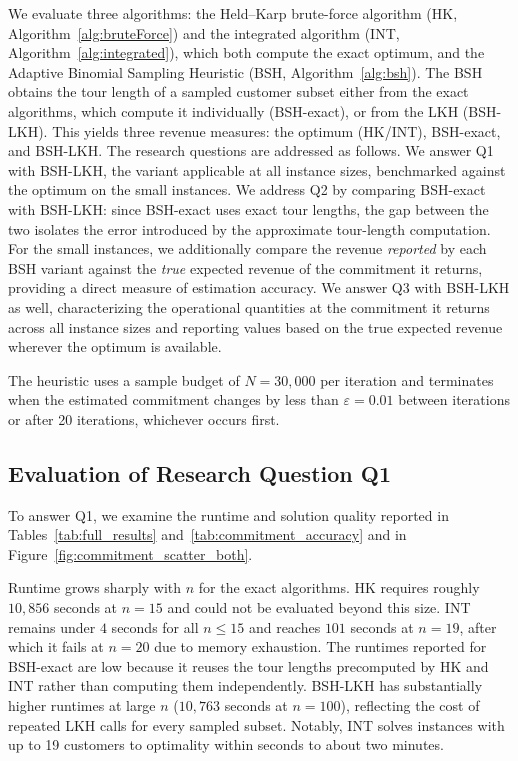 \documentclass[11pt]{article}
\theoremstyle{plain}
\theoremstyle{definition}
\begin{document}
 We evaluate three algorithms: the Held--Karp brute-force algorithm (HK, Algorithm~\ref{alg:bruteForce}) and the integrated algorithm (INT, Algorithm~\ref{alg:integrated}), which both compute the exact optimum, and the Adaptive Binomial Sampling Heuristic (BSH, Algorithm~\ref{alg:bsh}). The BSH obtains the tour length of a sampled customer subset either from the exact algorithms, which compute it individually (BSH-exact), or from the \ac{LKH} (BSH-\ac{LKH}). This yields three revenue measures: the optimum (HK/INT), BSH-exact, and BSH-\ac{LKH}. The research questions are addressed as follows. We answer Q1 with BSH-\ac{LKH}, the variant applicable at all instance sizes, benchmarked against the optimum on the small instances. We address Q2 by comparing BSH-exact with BSH-\ac{LKH}: since BSH-exact uses exact tour lengths, the gap between the two isolates the error introduced by the approximate tour-length computation. For the small instances, we additionally compare the revenue \emph{reported} by each BSH variant against the \emph{true} expected revenue of the commitment it returns, providing a direct measure of estimation accuracy. We answer Q3 with BSH-\ac{LKH} as well, characterizing the operational quantities at the commitment it returns across all instance sizes and reporting values based on the true expected revenue wherever the optimum is available.

 The heuristic uses a sample budget of $N = 30{,}000$ per iteration and terminates when the estimated commitment changes by less than $\varepsilon = 0.01$ between iterations or after 20 iterations, whichever occurs first.
 
 \subsection{Evaluation of Research Question Q1}\label{subsec:Performance}
  To answer Q1, we examine the runtime and solution quality reported in Tables~\ref{tab:full_results} and~\ref{tab:commitment_accuracy} and in Figure~\ref{fig:commitment_scatter_both}.
  
  Runtime grows sharply with $n$ for the exact algorithms. HK requires roughly $10{,}856$ seconds at $n = 15$ and could not be evaluated beyond this size. INT remains under $4$ seconds for all $n \leq 15$ and reaches $101$ seconds at $n = 19$, after which it fails at $n = 20$ due to memory exhaustion. The runtimes reported for BSH-exact are low because it reuses the tour lengths precomputed by HK and INT rather than computing them independently. BSH-\ac{LKH} has substantially higher runtimes at large $n$ ($10{,}763$ seconds at $n = 100$), reflecting the cost of repeated \ac{LKH} calls for every sampled subset. Notably, INT solves instances with up to 19 customers to optimality within seconds to about two minutes.
  
\end{document}
